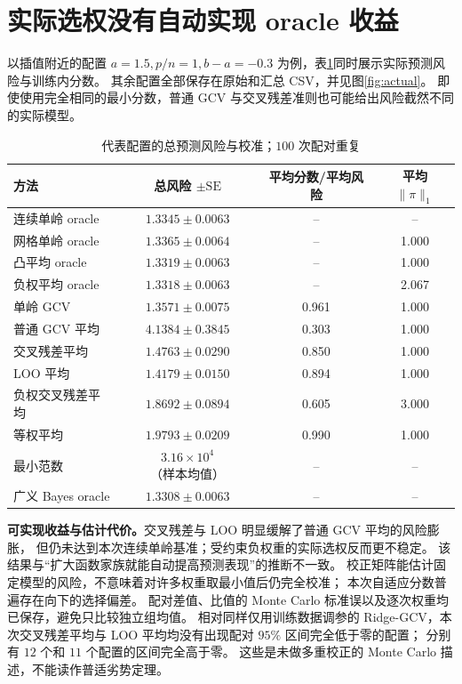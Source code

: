 \documentclass[UTF8,fontset=fandol,11pt,a4paper]{ctexart}
\begin{document}
\section{实际选权没有自动实现 oracle 收益}
以插值附近的配置 $a=1.5,p/n=1,b-a=-0.3$ 为例，表\ref{tab:actual}同时展示实际预测风险与训练内分数。
其余配置全部保存在原始和汇总 CSV，并见图\ref{fig:actual}。
即使使用完全相同的最小分数，普通 GCV 与交叉残差准则也可能给出风险截然不同的实际模型。
\begin{table}[htbp]\centering\small
\caption{代表配置的总预测风险与校准；$100$ 次配对重复}\label{tab:actual}
\renewcommand{\arraystretch}{1.2}
\begin{tabular}{lccc}\toprule
方法 & 总风险 $\pm\mathrm{SE}$ & 平均分数/平均风险 & 平均 $\lVert\pi\rVert_1$\\\midrule
连续单岭 oracle & $1.3345\pm0.0063$ & -- & -- \\
网格单岭 oracle & $1.3365\pm0.0064$ & -- & 1.000 \\
凸平均 oracle & $1.3319\pm0.0063$ & -- & 1.000 \\
负权平均 oracle & $1.3318\pm0.0063$ & -- & 2.067 \\
单岭 GCV & $1.3571\pm0.0075$ & 0.961 & 1.000 \\
普通 GCV 平均 & $4.1384\pm0.3845$ & 0.303 & 1.000 \\
交叉残差平均 & $1.4763\pm0.0290$ & 0.850 & 1.000 \\
LOO 平均 & $1.4179\pm0.0150$ & 0.894 & 1.000 \\
负权交叉残差平均 & $1.8692\pm0.0894$ & 0.605 & 3.000 \\
等权平均 & $1.9793\pm0.0209$ & 0.990 & 1.000 \\
最小范数 & $3.16\times10^{4}$（样本均值） & -- & -- \\
广义 Bayes oracle & $1.3308\pm0.0063$ & -- & -- \\
\bottomrule\end{tabular}
\par\vspace{3pt}{\footnotesize oracle 的已知生成参数风险不作为训练内分数。
最小范数在 $p=n$ 下的理论期望风险为无穷，样本均值仅作描述，不报告普通均值 SE。}
\end{table}

\textbf{可实现收益与估计代价。}交叉残差与 LOO 明显缓解了普通 GCV 平均的风险膨胀，
但仍未达到本次连续单岭基准；受约束负权重的实际选权反而更不稳定。
该结果与“扩大函数家族就能自动提高预测表现”的推断不一致。
校正矩阵能估计固定模型的风险，不意味着对许多权重取最小值后仍完全校准；
本次自适应分数普遍存在向下的选择偏差。
配对差值、比值的 Monte Carlo 标准误以及逐次权重均已保存，避免只比较独立组均值。
相对同样仅用训练数据调参的 Ridge-GCV，本次交叉残差平均与 LOO 平均均没有出现配对 $95\%$ 区间完全低于零的配置；
分别有 $12$ 个和 $11$ 个配置的区间完全高于零。
这些是未做多重校正的 Monte Carlo 描述，不能读作普适劣势定理。
\end{document}
